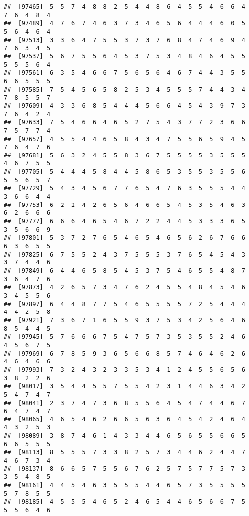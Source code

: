 \documentclass[
]{book}
\begin{document}
\begin{verbatim}
##  [97465]  5  5  7  4  8  8  2  5  4  4  8  6  4  5  5  4  6  6  4  7  6  4  8  4
##  [97489]  4  7  6  7  4  6  3  7  3  4  6  5  6  4  4  4  6  0  5  5  6  4  6  4
##  [97513]  3  3  6  4  7  5  5  3  7  3  7  6  8  4  7  4  6  9  4  7  6  3  4  5
##  [97537]  5  6  7  5  5  6  4  5  3  7  5  3  4  8  4  6  4  5  5  5  5  5  6  4
##  [97561]  6  3  5  4  6  6  7  5  6  5  6  4  6  7  4  4  3  5  5  6  6  5  5  5
##  [97585]  7  5  4  5  6  5  8  2  5  3  4  5  5  5  7  4  4  3  4  7  8  5  5  7
##  [97609]  4  3  3  6  8  5  4  4  4  5  6  6  4  5  4  3  9  7  3  7  6  4  2  4
##  [97633]  7  5  4  6  6  4  6  5  2  7  5  4  3  7  7  2  3  6  6  7  5  7  7  4
##  [97657]  4  5  5  4  4  6  5  8  4  3  4  7  5  5  6  5  9  4  5  7  6  4  7  6
##  [97681]  5  6  3  2  4  5  5  8  3  6  7  5  5  5  5  3  5  5  5  4  6  7  5  5
##  [97705]  5  4  4  4  5  8  4  4  5  8  6  5  3  5  5  3  5  5  6  5  5  6  5  7
##  [97729]  5  4  3  4  5  6  7  7  6  5  4  7  6  3  5  5  5  4  4  3  6  6  4  4
##  [97753]  6  2  2  4  2  6  5  6  4  6  6  5  4  5  3  5  4  6  3  6  2  6  6  6
##  [97777]  6  6  6  4  6  5  4  6  7  2  2  4  4  5  3  3  3  6  5  3  5  6  6  9
##  [97801]  5  3  7  2  7  6  5  4  6  5  4  6  5  6  2  6  7  6  6  6  3  6  5  5
##  [97825]  6  7  5  5  2  4  3  7  5  5  5  3  7  6  5  4  5  4  3  3  7  4  4  6
##  [97849]  6  4  4  6  5  8  5  4  5  3  7  5  4  6  5  5  4  8  7  3  6  4  7  6
##  [97873]  4  2  6  5  7  3  4  7  6  2  4  5  5  4  8  4  5  4  6  3  4  5  5  6
##  [97897]  6  4  4  8  7  7  5  4  6  5  5  5  5  7  2  5  4  4  4  4  4  2  5  8
##  [97921]  7  3  6  7  1  6  5  5  9  3  7  5  3  4  2  5  6  4  6  8  5  4  4  5
##  [97945]  5  7  6  6  6  7  5  4  7  5  7  3  5  3  5  5  2  4  6  4  5  6  7  5
##  [97969]  6  7  8  5  9  3  6  5  6  6  8  5  7  4  6  4  6  2  6  4  6  4  6  6
##  [97993]  7  3  2  4  3  2  3  3  5  3  4  1  2  4  5  5  6  5  6  3  8  2  2  6
##  [98017]  3  5  4  4  5  5  7  5  5  4  2  3  1  4  4  6  3  4  2  5  4  7  4  7
##  [98041]  2  3  7  4  7  3  6  8  5  5  6  4  5  4  7  4  4  6  7  6  4  7  4  7
##  [98065]  4  6  5  4  6  2  6  6  5  6  3  6  4  5  4  2  4  6  4  4  3  2  5  3
##  [98089]  3  8  7  4  6  1  4  3  3  4  4  6  5  6  5  5  6  6  5  6  6  5  5  5
##  [98113]  8  5  5  5  7  3  3  8  2  5  7  3  4  4  6  2  4  4  7  4  6  7  3  4
##  [98137]  8  6  6  5  7  5  5  6  7  6  2  5  7  5  7  7  5  7  3  3  5  4  8  5
##  [98161]  4  4  5  4  6  3  5  5  5  4  4  6  5  7  3  5  5  5  5  5  7  8  5  5
##  [98185]  4  5  5  5  4  6  5  2  4  6  5  4  4  6  5  6  6  7  5  5  5  6  4  6

\end{verbatim}
\end{document}
